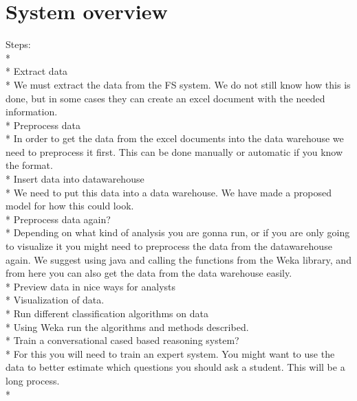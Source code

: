 \chapter{System overview}

Steps:\\*
\\*
Extract data\\*
We must extract the data from the FS system. We do not still know how this is done, but in some cases they can create an excel document with the needed information.
\\*
Preprocess data\\*
In order to get the data from the excel documents into the data warehouse we need to preprocess it first. This can be done manually or automatic if you know the format.
\\*
Insert data into datawarehouse\\*
We need to put this data into a data warehouse. We have made a proposed model for how this could look.
\\*
Preprocess data again?\\*
Depending on what kind of analysis you are gonna run, or if you are only going to visualize it you might need to preprocess the data from the datawarehouse again.
We suggest using java and calling the functions from the Weka library, and from here you can also get the data from the data warehouse easily.
\\*
Preview data in nice ways for analysts\\*
Visualization of data.
\\*
Run different classification algorithms on data\\*
Using Weka run the algorithms and methods described.
\\*
Train a conversational cased based reasoning system?\\*
For this you will need to train an expert system.
You might want to use the data to better estimate which questions you should ask a student.
This will be a long process.
\\*




